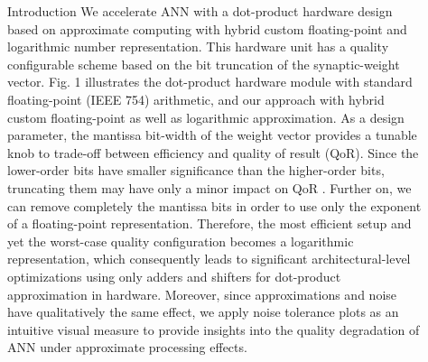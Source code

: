 \documentclass[final]{beamer}
\newlength{\sepwid}
\newlength{\onecolwid}
\newlength{\twocolwid}
\begin{document}
\begin{frame}[t]
\begin{columns}[t]
\begin{column}{\onecolwid}
\begin{block}{Introduction}
We accelerate ANN with a dot-product hardware design based on approximate computing with hybrid custom floating-point and logarithmic number representation. This hardware unit has a quality configurable scheme based on the bit truncation of the synaptic-weight vector. Fig. 1 illustrates the dot-product hardware module with standard floating-point (IEEE 754) arithmetic, and our approach with hybrid custom floating-point as well as logarithmic approximation. As a design parameter, the mantissa bit-width of the weight vector provides a tunable knob to trade-off between efficiency and quality of result (QoR)\cite{han2013approximate}. Since the lower-order bits have smaller significance than the higher-order bits, truncating them may have only a minor impact on QoR \cite{mittal2016survey}. Further on, we can remove completely the mantissa bits in order to use only the exponent of a floating-point representation. Therefore, the most efficient setup and yet the worst-case quality configuration becomes a logarithmic representation, which consequently leads to significant architectural-level optimizations using only adders and shifters for dot-product approximation in hardware. Moreover, since approximations and noise have qualitatively the same effect\cite{venkataramani2015approximate}, we apply noise tolerance plots as an intuitive visual measure to provide insights into the quality degradation of ANN under approximate processing effects.


\end{block}

\end{column} %

\begin{column}{\sepwid}\end{column} %

\begin{column}{\twocolwid} %

\begin{columns}[t,totalwidth=\twocolwid] %

\begin{column}{\onecolwid}\vspace{-.6in} %



\end{column}
\end{columns}
\end{column}
\end{columns}
\end{frame}
\end{document}
